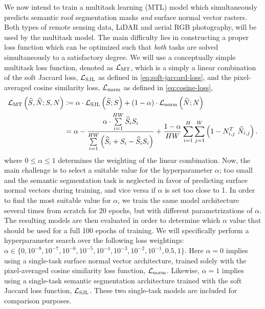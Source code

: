 We now intend to train a multitask learning (MTL) model which simultaneously predicts semantic roof segmentation masks \emph{and} surface normal vector rasters.
Both types of remote sensing data, LiDAR and aerial RGB photography, will be used by the multitask model.
The main difficulty lies in constructing a proper loss function which can be optimized such that \emph{both} tasks are solved simultaneously to a satisfactory degree.
We will use a conceptually simple multitask loss function, denoted as $\mathcal{L}_{\mathrm{MT}}$, which is a simply a linear combination of the soft Jaccard loss, $\mathcal{L}_{\mathrm{SJL}}$ as defined in \cref{eq:soft-jaccard-loss}, and the pixel-averaged cosine similarity loss, $\mathcal{L}_{\mathrm{norm}}$ as defined in \cref{eq:cosine-loss},
\begin{align*}
  \mtlossf
  &\defeq
  \alpha \cdot \seglossf
  +
  (1 - \alpha) \cdot \normlossf
  \\
  &=
  \alpha - \frac{%
    \alpha \cdot \sum\limits_{i = 1}^{HW}
    \predsegraster_i \segraster_i
  }{%
    \sum\limits_{i = 1}^{HW} \left(
      \predsegraster_i
      +
      \segraster_i
      -
      \predsegraster_i \segraster_i
    \right)
  }
  +
  \frac{1 - \alpha}{HW}
  \sum_{i = 1}^{H} \sum_{j = 1}^{W} \left(
    1 - \normraster_{i,j}^T~\prednormraster_{i,j}
  \right).
\end{align*}
%
where $0 \leq \alpha \leq 1$ determines the weighting of the linear combination.
Now, the main challenge is to select a suitable value for the hyperparameter $\alpha$; too small and the semantic segmentation task is neglected in favor of predicting surface normal vectors during training, and vice versa if $\alpha$ is set too close to 1.
In order to find the most suitable value for $\alpha$, we train the same model architecture several times from scratch for 20 epochs, but with different parametrizations of $\alpha$.
The resulting models are then evaluated in order to determine which $\alpha$ value that should be used for a full 100 epochs of training.
We will specifically perform a hyperparameter search over the following loss weightings: $\alpha \in \{0,\allowbreak 10^{-8},\allowbreak 10^{-7},\allowbreak 10^{-6},\allowbreak 10^{-5},\allowbreak 10^{-4},\allowbreak 10^{-3},\allowbreak 10^{-2},\allowbreak 10^{-1},\allowbreak 0.5,\allowbreak 1\}$.
Here $\alpha = 0$ implies using a single-task surface normal vector architecture, trained solely with the pixel-averaged cosine similarity loss function, $\mathcal{L}_{\mathrm{norm}}$.
Likewise, $\alpha = 1$ implies using a single-task semantic segmentation architecture trained with the soft Jaccard loss function, $\mathcal{L}_{\mathrm{SJL}}$.
These two single-task models are included for comparison purposes.

